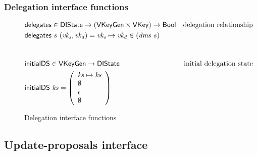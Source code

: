 \subsubsection{Delegation interface functions}
\label{sec:delegation-interface-functions}

\begin{figure}[htb]
  \begin{align*}
    & \fun{delegates} \in \DIState \to (\VKeyGen \times \VKey) \to \Bool & \text{delegation relationship}\\
    & \fun{delegates}~s~(\var{vk_s}, \var{vk_d}) = \var{vk_s} \mapsto \var{vk_d} \in (\var{dms}~s)\\
    \nextdef
    & \fun{initialDS} \in \VKeyGen \to \DIState & \text{initial delegation state}\\
    & \fun{initialDS}~\var{ks} =
      \left(
      \begin{array}{l}
        \var{ks} \mapsto \var{ks}\\
        \emptyset\\
        \epsilon\\
        \emptyset\\
      \end{array}
      \right)
  \end{align*}
  \caption{Delegation interface functions}
\end{figure}

\clearpage

\subsection{Update-proposals interface}
\label{sec:update-proposals-interface}


